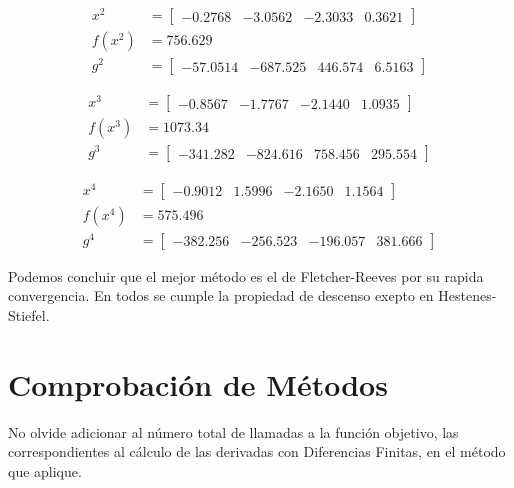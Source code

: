 \documentclass[12pt]{article}
\begin{document}

\begin{align*}
    x^2 &= \begin{bmatrix}
        -0.2768 & -3.0562 & -2.3033 & 0.3621
    \end{bmatrix} \\
    f(x^2) &= 756.629\\
    g^2 &= \begin{bmatrix}
        -57.0514 & -687.525 & 446.574 & 6.5163
    \end{bmatrix}
\end{align*}


\begin{align*}
    x^3 &= \begin{bmatrix}
        -0.8567 & -1.7767 & -2.1440 & 1.0935
    \end{bmatrix} \\
    f(x^3) &= 1073.34\\
    g^3 &= \begin{bmatrix}
        -341.282 & -824.616 & 758.456 & 295.554
    \end{bmatrix}
\end{align*}


\begin{align*}
    x^4 &= \begin{bmatrix}
        -0.9012 & 1.5996 & -2.1650 & 1.1564
    \end{bmatrix} \\
    f(x^4) &= 575.496\\
    g^4 &= \begin{bmatrix}
        -382.256 & -256.523 & -196.057 & 381.666
    \end{bmatrix}
\end{align*}

Podemos concluir que el mejor método es el de Fletcher-Reeves por su rapida convergencia.
En todos se cumple la propiedad de descenso exepto en Hestenes-Stiefel.


\section*{Comprobación de Métodos}

No olvide adicionar al número total de llamadas a la función objetivo, las correspondientes al cálculo de las derivadas con Diferencias Finitas, en el método que aplique.
\end{document}
